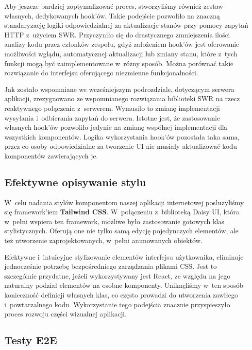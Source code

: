 Aby jeszcze bardziej zoptymalizować proces, stworzyliśmy
również zestaw własnych, dedykowanych hook'ów. Takie podejście pozwoliło na
znaczną standaryzację logiki odpowiedzialnej za aktualizacje stanów przy pomocy
zapytań HTTP z~użyciem SWR. Przyczyniło się do drastycznego zmniejszenia ilości
analizy kodu przez członków zespołu, gdyż założeniem hook'ów jest oferowanie
możliwości wglądu, automatycznej aktualizacji lub zmiany stanu, które z~tych
funkcji mogą być zaimplementowane w~różny sposób. Można porównać takie rozwiązanie
do interfejsu oferującego niezmienne funkcjonalności.


Jak zostało wspomniane we wcześniejszym podrozdziale, dotyczącym serwera aplikacji,
zrezygnowano ze wspomnianego rozwiązania biblioteki SWR na rzecz reaktywnego
połączenia z~serwerem. Wymusiło to zmianę implementacji wysyłania i~odbierania
zapytań do serwera. Istotne jest, że zastosowanie własnych hook'ów pozwoliło
jedynie na zmianę wspólnej implementacji dla wszystkich komponentów. Logika
wykorzystania hook'ów pozostała taka sama, przez co osoby odpowiedzialne za
tworzenie UI nie musiały aktualizować kodu komponentów zawierających je.

\subsection{Efektywne opisywanie stylu}
W~celu nadania stylów komponentom naszej aplikacji internetowej posłużyliśmy się
framework'iem \textbf{Tailwind CSS}. W~połączeniu z~biblioteką Daisy UI, która
w~pełni wspiera ten framework, możliwe było zastosowanie gotowych klas
stylistycznych. Oferują one nie tylko samą edycję pojedynczych elementów, ale też
utworzenie zaprojektowanych, w~pełni animowanych obiektów.

Efektywne i~intuicyjne stylizowanie elementów interfejsu użytkownika, eliminuje
jednocześnie potrzebę bezpośredniego zarządzania plikami CSS. Jest to szczególnie
przydatne, jeżeli wykorzystywany jest React, ze względu na jego naturalny podział
elementów na osobne komponenty. Uniknęliśmy w~ten sposób konieczność
definicji własnych klas, co często prowadzi do utworzenia zawiłego
i~powtarzalnego kodu. Wykorzystanie tego podejścia znacznie przyspieszyło
proces rozwoju części wizualnej aplikacji.


\subsection{Testy E2E}


